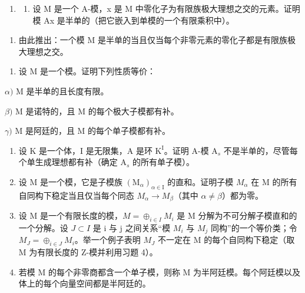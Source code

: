 
\begin{enumerate}
\def\labelenumi{\arabic{enumi})}
\tightlist
\item
  \begin{enumerate}
  \def\labelenumii{\alph{enumii})}
  \tightlist
  \item
    设 M 是一个 A-模，x 是 M 中零化子为有限族极大理想之交的元素。证明模 Ax 是半单的（把它嵌入到单模的一个有限乘积中）。
  \end{enumerate}
\end{enumerate}

\begin{enumerate}
\def\labelenumi{\alph{enumi})}
\setcounter{enumi}{1}
\tightlist
\item
  由此推出：一个模 M 是半单的当且仅当每个非零元素的零化子都是有限族极大理想之交。
\end{enumerate}

\begin{enumerate}
\def\labelenumi{\arabic{enumi})}
\setcounter{enumi}{1}
\tightlist
\item
  设 M 是一个模。证明下列性质等价：
\end{enumerate}

\(\alpha)\) M 是半单的且长度有限。

\(\beta)\) M 是诺特的，且 M 的每个极大子模都有补。

\(\gamma)\) M 是阿廷的，且 M 的每个单子模都有补。

\begin{enumerate}
\def\labelenumi{\arabic{enumi})}
\setcounter{enumi}{2}
\item
  设 \(\mathrm{K}\) 是一个体，I 是无限集，A 是环 \(\mathrm{K}^{\mathrm{I}}\)。证明 A-模 \(\mathrm{A}_s\) 不是半单的，尽管每个单生成理想都有补（确定 \(\mathrm{A}_s\) 的所有单子模）。
\item
  设 M 是一个模，它是子模族 \((\mathrm{M}_{\alpha})_{\alpha\in\mathrm{I}}\) 的直和。证明子模 \(M_{\alpha}\) 在 M 的所有自同构下稳定当且仅当每个同态 \(M_{\alpha}\to M_{\beta}\)（其中 \(\alpha\neq\beta\)）都为零。
\item
  设 M 是一个有限长度的模，\(M = \oplus_{i \in I} M_i\) 是 M 分解为不可分解子模直和的一个分解。设 \(J \subset I\) 是 i 与 j 之间关系“模 \(M_i\) 与 \(M_j\) 同构”的一个等价类；令 \(M_J = \oplus_{i \in J} M_i\)。举一个例子表明 \(M_J\) 不一定在 M 的每个自同构下稳定（取 M 为有限长度的 Z-模并利用习题 4）。
\item
  若模 M 的每个非零商都含一个单子模，则称 M 为半阿廷模。每个阿廷模以及体上的每个向量空间都是半阿廷的。
\end{enumerate}

